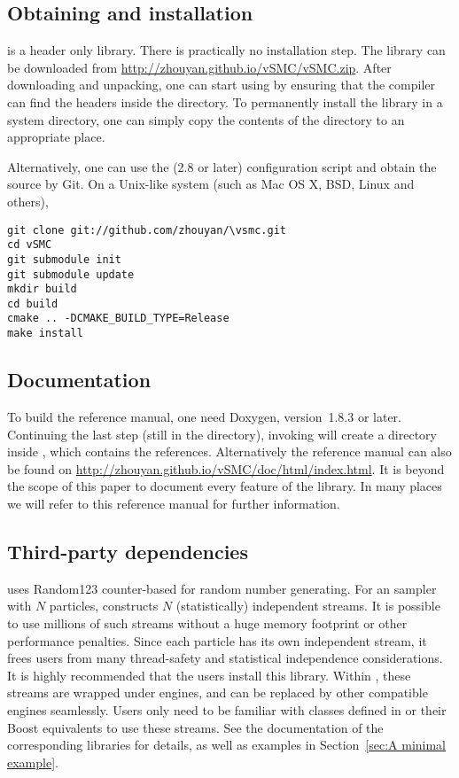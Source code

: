 \subsection{Obtaining and installation}

\vsmc is a header only library. There is practically no installation step. The
library can be downloaded from \url{http://zhouyan.github.io/vSMC/vSMC.zip}.
After downloading and unpacking, one can start using \vsmc by ensuring that
the compiler can find the headers inside the  directory. To
permanently install the library in a system directory, one can simply copy the
contents of the  directory to an appropriate place.

Alternatively, one can use the \cmake (2.8 or later) configuration script and
obtain the source by Git. On a Unix-like system (such as Mac OS X, BSD, Linux
and others),
\begin{verbatim}
git clone git://github.com/zhouyan/\vsmc.git
cd vSMC
git submodule init
git submodule update
mkdir build
cd build
cmake .. -DCMAKE_BUILD_TYPE=Release
make install
\end{verbatim}

\subsection{Documentation}

To build the reference manual, one need Doxygen, version~1.8.3 or later.
Continuing the last step (still in the  directory), invoking
 will create a  directory inside , which
contains the \html references. Alternatively the reference manual can also be
found on \url{http://zhouyan.github.io/vSMC/doc/html/index.html}. It is beyond
the scope of this paper to document every feature of the \vsmc library. In many
places we will refer to this reference manual for further information.

\subsection{Third-party dependencies}

\vsmc uses Random123 \cite{Salmon:2011um} counter-based \rng for random number
generating. For an \smc sampler with $N$ particles, \vsmc constructs $N$
(statistically) independent \rng streams. It is possible to use millions of
such streams without a huge memory footprint or other performance penalties.
Since each particle has its own independent \rng stream, it frees users from
many thread-safety and statistical independence considerations. It is highly
recommended that the users install this library. Within \vsmc, these \rng
streams are wrapped under \cppoo \rng engines, and can be replaced by other
compatible \rng engines seamlessly. Users only need to be familiar with
classes defined in \cppoo{}  or their Boost equivalents to use
these \rng streams. See the documentation of the corresponding libraries for
details, as well as examples in Section~\ref{sec:A minimal example}.

